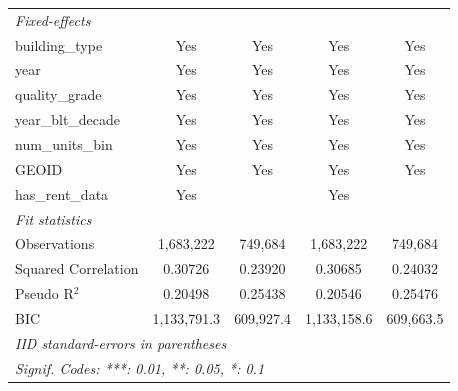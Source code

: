 \begin{tabular}{lcccc}
   \emph{Fixed-effects}\\
   building\_type                            & Yes            & Yes            & Yes            & Yes\\  
   year                                      & Yes            & Yes            & Yes            & Yes\\  
   quality\_grade                            & Yes            & Yes            & Yes            & Yes\\  
   year\_blt\_decade                         & Yes            & Yes            & Yes            & Yes\\  
   num\_units\_bin                           & Yes            & Yes            & Yes            & Yes\\  
   GEOID                                     & Yes            & Yes            & Yes            & Yes\\  
   has\_rent\_data                           & Yes            &                & Yes            & \\  
   \midrule
   \emph{Fit statistics}\\
   Observations                              & 1,683,222      & 749,684        & 1,683,222      & 749,684\\  
   Squared Correlation                       & 0.30726        & 0.23920        & 0.30685        & 0.24032\\  
   Pseudo R$^2$                              & 0.20498        & 0.25438        & 0.20546        & 0.25476\\  
   BIC                                       & 1,133,791.3    & 609,927.4      & 1,133,158.6    & 609,663.5\\  
   \midrule \midrule
   \multicolumn{5}{l}{\emph{IID standard-errors in parentheses}}\\
   \multicolumn{5}{l}{\emph{Signif. Codes: ***: 0.01, **: 0.05, *: 0.1}}\\
\end{tabular}
\par\endgroup
